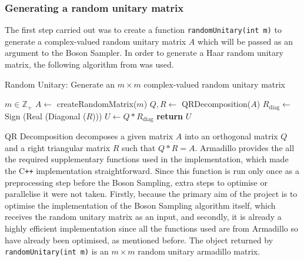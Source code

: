 \documentclass[11pt]{article}
\theoremstyle{theorem}
\theoremstyle{theorem}
\theoremstyle{remark}
\theoremstyle{note}
\theoremstyle{plain}
\theoremstyle{definition}
\begin{document}
\subsubsection{Generating a random unitary matrix}
The first step carried out was to create a function \texttt{randomUnitary(int m)} to generate a complex-valued random unitary matrix $A$ which will be passed as an argument to the Boson Sampler. In order to generate a Haar random unitary matrix, the following algorithm from \cite{ozols2009} was used.
\begin{algorithm}
\caption{Random Unitary: Generate an $m \times m$ complex-valued random unitary matrix}
\begin{algorithmic}[1]
\Require $m \in \mathbb{Z}_+$
\State $A \leftarrow$ createRandomMatrix($m$)
\State $Q, R \leftarrow$ QRDecomposition($A$)
\State $R_{\text{diag}} \leftarrow$ Sign (Real (Diagonal ($R$)))
\State $U \leftarrow Q * R_{\text{diag}}$
\State \textbf{return} $U$
\end{algorithmic}
\end{algorithm}
QR Decomposition decomposes a given matrix $A$ into an orthogonal matrix $Q$ and a right triangular matrix $R$ such that $Q * R = A$. Armadillo provides the all the required supplementary functions used in the implementation, which made the C\texttt{++} implementation straightforward. Since this function is run only once as a preprocessing step before the Boson Sampling, extra steps to optimise or parallelise it were not taken. Firstly, because the primary aim of the project is to optimise the implementation of the Boson Sampling algorithm itself, which receives the random unitary matrix as an input, and secondly, it is already a highly efficient implementation since all the functions used are from Armadillo so have already been optimised, as mentioned before. The object returned by \texttt{randomUnitary(int m)} is an $m \times m$ random unitary armadillo matrix.
\end{document}

